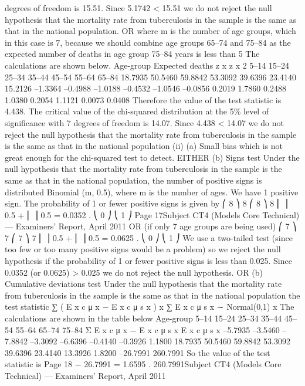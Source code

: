 \documentclass[a4paper,12pt]{article}
\begin{document}
\begin{enumerate}
degrees of freedom is 15.51.
Since 5.1742 < 15.51 we do not reject the null hypothesis that the mortality rate from tuberculosis in the sample is the same as that in the national population.
OR
where m is the number of age groups, which in this case is 7, because we should combine age groups 65–74 and 75–84 as the expected number of deaths in age group 75–84 years is less than 5
The calculations are shown below.
Age-group Expected deaths z x z x 2
5–14
15–24
25–34
35–44
45–54
55–64
65–84 18.7935
50.5460
59.8842
53.3092
39.6396
23.4140
15.2126 –1.3364
–0.4988
–1.0188
–0.4532
–1.0546
–0.0856
0.2019 1.7860
0.2488
1.0380
0.2054
1.1121
0.0073
0.0408
Therefore the value of the test statistic is 4.438.
The critical value of the chi-squared distribution at the 5\% level of significance with 7
degrees of freedom is 14.07.
Since 4.438 < 14.07 we do not reject the null hypothesis that the mortality rate from tuberculosis in the sample is the same as that in the national population
(ii)
(a)
Small bias which is not great enough for the chi-squared test to detect.
EITHER
(b)
Signs test
Under the null hypothesis that the mortality rate from tuberculosis in the sample is the same as that in the national population,
the number of positive signs is distributed Binomial (m, 0.5), where m is the number of ages.
We have 1 positive sign.
The probability of 1 or fewer positive signs is given by
⎛ 8 ⎞ 8 ⎛ 8 ⎞ 8
⎜ ⎟ 0.5 + ⎜ ⎟ 0.5 = 0.0352 .
⎝ 0 ⎠
⎝ 1 ⎠
Page 17Subject CT4 (Models Core Technical) — Examiners’ Report, April 2011
OR (if only 7 age groups are being used)
⎛ 7 ⎞ 7 ⎛ 7 ⎞ 7
⎜ ⎟ 0.5 + ⎜ ⎟ 0.5 = 0.0625 .
⎝ 0 ⎠
⎝ 1 ⎠
We use a two-tailed test (since too few or too many positive signs would be a
problem)
so we reject the null hypothesis if the probability of 1 or fewer positive signs
is less than 0.025.
Since 0.0352 (or 0.0625) > 0.025
we do not reject the null hypothesis.
OR
(b)
Cumulative deviations test
Under the null hypothesis that the mortality rate from tuberculosis in the sample is the same as that in the national population
the test statistic
∑ ( E x c μ x − E x c μ s x )
x
∑ E x c μ s x
∼ Normal(0,1)
x
The calculations are shown in the table below
Age-group
5–14
15–24
25–34
35–44
45–54
55–64
65–74
75–84
Σ
E x c μ x − E x c μ s x E x c μ s x
–5.7935
–3.5460
–7.8842
–3.3092
–6.6396
–0.4140
–0.3926
1.1800 18.7935
50.5460
59.8842
53.3092
39.6396
23.4140
13.3926
1.8200
–26.7991 260.7991
So the value of the test statistic is
Page 18
− 26.7991
= 1.6595 .
260.7991Subject CT4 (Models Core Technical) — Examiners’ Report, April 2011

\end{enumerate}
\end{document}
